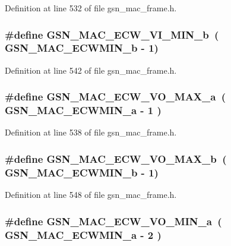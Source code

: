 Definition at line 532 of file gsn\_\-mac\_\-frame.h.

\hypertarget{a00523_a576a3aa4cb41ef36984ba8699c985220}{
\subsubsection[{GSN\_\-MAC\_\-ECW\_\-VI\_\-MIN\_\-b}]{\setlength{\rightskip}{0pt plus 5cm}\#define GSN\_\-MAC\_\-ECW\_\-VI\_\-MIN\_\-b~( GSN\_\-MAC\_\-ECWMIN\_\-b -\/ 1)}}
\label{a00523_a576a3aa4cb41ef36984ba8699c985220}


Definition at line 542 of file gsn\_\-mac\_\-frame.h.

\hypertarget{a00523_abc21841953ee9eb0f9b3a81882ee3ea5}{
\subsubsection[{GSN\_\-MAC\_\-ECW\_\-VO\_\-MAX\_\-a}]{\setlength{\rightskip}{0pt plus 5cm}\#define GSN\_\-MAC\_\-ECW\_\-VO\_\-MAX\_\-a~( GSN\_\-MAC\_\-ECWMIN\_\-a -\/ 1 )}}
\label{a00523_abc21841953ee9eb0f9b3a81882ee3ea5}


Definition at line 538 of file gsn\_\-mac\_\-frame.h.

\hypertarget{a00523_a0959b65e1f676c611f1efd6aef99871d}{
\subsubsection[{GSN\_\-MAC\_\-ECW\_\-VO\_\-MAX\_\-b}]{\setlength{\rightskip}{0pt plus 5cm}\#define GSN\_\-MAC\_\-ECW\_\-VO\_\-MAX\_\-b~( GSN\_\-MAC\_\-ECWMIN\_\-b -\/ 1)}}
\label{a00523_a0959b65e1f676c611f1efd6aef99871d}


Definition at line 548 of file gsn\_\-mac\_\-frame.h.

\hypertarget{a00523_a339af19601a6713ca3914f8f4f5cfca3}{
\subsubsection[{GSN\_\-MAC\_\-ECW\_\-VO\_\-MIN\_\-a}]{\setlength{\rightskip}{0pt plus 5cm}\#define GSN\_\-MAC\_\-ECW\_\-VO\_\-MIN\_\-a~( GSN\_\-MAC\_\-ECWMIN\_\-a -\/ 2 )}}
\label{a00523_a339af19601a6713ca3914f8f4f5cfca3}


